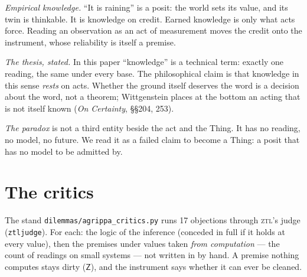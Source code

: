 \documentclass[11pt,a4paper]{article}
\newcommand{\Z}{\mathsf{Z}}
\newcommand{\ZTL}{\textsc{ztl}}
\newcommand{\code}[1]{\texttt{#1}}
\begin{document}
\emph{Empirical knowledge.} ``It is raining'' is a posit: the world sets its value, and its twin is thinkable. It is
knowledge on credit. Earned knowledge is only what acts force. Reading an observation as an act of measurement moves
the credit onto the instrument, whose reliability is itself a premise.

\emph{The thesis, stated.} In this paper ``knowledge'' is a technical term: exactly one reading, the same under
every base. The philosophical claim is that knowledge in this sense \emph{rests} on acts. Whether the ground itself
deserves the word is a decision about the word, not a theorem; Wittgenstein places at the bottom an acting that is
not itself known (\emph{On Certainty}, §§204, 253).

\emph{The paradox} is not a third entity beside the act and the Thing. It has no reading, no model, no future. We
read it as a failed claim to become a Thing: a posit that has no model to be admitted by.

\section{The critics}

The stand \code{dilemmas/agrippa\_critics.py} runs 17 objections through \ZTL's judge (\code{ztljudge}). For each: the
logic of the inference (conceded in full if it holds at every value), then the premises under values taken \emph{from
computation} --- the count of readings on small systems --- not written in by hand. A premise nothing computes stays
dirty ($\Z$), and the instrument says whether it can ever be cleaned.
\end{document}
